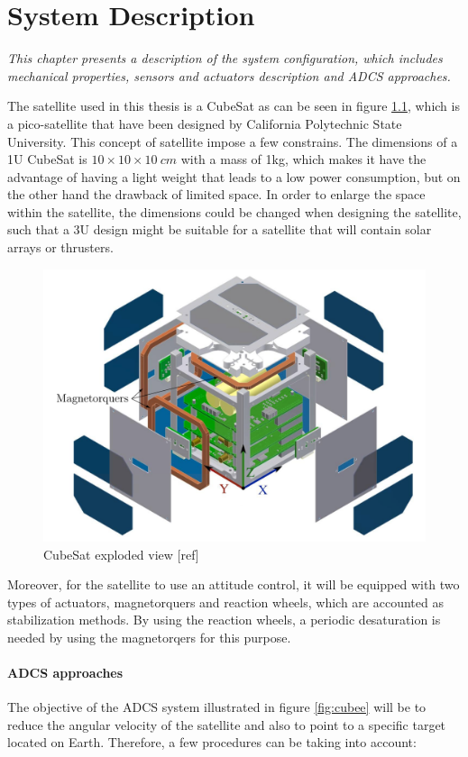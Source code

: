 \chapter{System Description}\label{chap:systemDescribtion}
\textit{This chapter presents a description of the system configuration, which includes mechanical properties, sensors and actuators description and ADCS approaches.}

The satellite used in this thesis is a CubeSat as can be seen in figure \ref{fig:cube}, which is a pico-satellite that have been designed by California Polytechnic State University. This concept of satellite impose a few constrains. The dimensions of a 1U CubeSat  is $10 \times 10 \times 10 \ cm$ with a mass of 1kg, which makes it have the advantage of having a light weight that leads to a low power consumption, but on the other hand the drawback of limited space. In order to enlarge the space within the satellite, the dimensions could be changed when designing the satellite, such that a 3U design might be suitable for a satellite that will contain solar arrays or thrusters.

\begin{figure}[H]
	\centering
	\includegraphics[width=0.7\linewidth]{figures/cubesat}
	\caption{CubeSat exploded view [ref]}
	\label{fig:cube}
\end{figure}

Moreover, for the satellite to use an attitude control, it will be equipped with two types of actuators, magnetorquers and reaction wheels, which are accounted as stabilization methods. By using the reaction wheels, a periodic desaturation is needed by using the magnetorqers for this purpose.

\subsubsection{ADCS approaches}
The objective of the ADCS system illustrated in figure \ref{fig:cubee} will be to reduce the angular velocity of the satellite and also to point to a specific target located on Earth. Therefore, a few procedures can be taking into account:


